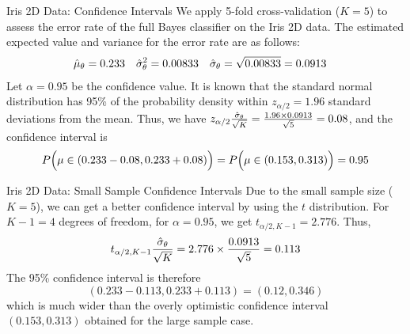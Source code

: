 \begin{frame}{Iris 2D Data: Confidence Intervals}
We apply 5-fold
cross-validation ($K=5$) to assess the error rate of the full
Bayes classif\/{i}er on the Iris 2D data. 
The estimated expected value and variance for
the error rate are as follows:
\begin{align*}
  \hat{\mu}_\theta &= 0.233 & \hat{\sigma}^2_\theta & = 0.00833 &
  \hat{\sigma}_\theta & =
  \sqrt{0.00833} = 0.0913
\end{align*}
Let $\alpha = 0.95$ be the conf\/{i}dence value. 
It is known that the
standard normal distribution has 95\% of the probability density within
$z_{\alpha/2}=1.96$ standard deviations from the mean.
Thus, we have $z_{\alpha/2}{\hat{\sigma}_\theta \over \sqrt{K}} = {1.96
\times 0.0913 \over \sqrt{5}} = 0.08$, and the confidence interval is
\begin{align*}
  P\Bigl( \mu \in (0.233 - 0.08, 0.233 + 0.08) \Bigr) =
  P\Bigl( \mu \in (0.153, 0.313) \Bigr) = 0.95
\end{align*}
\end{frame}


\begin{frame}{Iris 2D Data: Small Sample Confidence Intervals}
Due to the small sample
size ($K=5$), we can get a better conf\/{i}dence interval by using the $t$
distribution. For $K-1=4$ degrees of freedom, for $\alpha=0.95$, we get
$t_{\alpha/2,K-1} = 2.776$.
Thus,
$$t_{\alpha/2,K-1}{\hat{\sigma}_\theta \over \sqrt{K}} = 2.776 \times {0.0913
\over \sqrt{5}}  = 0.113$$
The 95\% conf\/{i}dence interval is therefore $$(0.233-0.113,0.233+0.113) =
(0.12, 0.346)$$
which is much wider than the overly optimistic
conf\/{i}dence interval $(0.153,0.313)$
obtained for the large sample case.
\end{frame}



